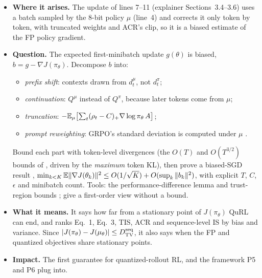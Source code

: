 \documentclass[11pt]{article}
\begin{document}
\begin{itemize}
\item \textbf{Where it arises.} The update of lines 7--11 (explainer Sections~3.4--3.6) uses a batch sampled by the 8-bit policy $\mu$ (line~4) and corrects it only token by token, with truncated weights and ACR's clip, so it is a biased estimate of the FP policy gradient.
\item \textbf{Question.} The expected first-minibatch update $g(\theta)$ is biased, $b=g-\nabla J(\pi_\theta)$. Decompose $b$ into:
  \begin{itemize}
  \item \emph{prefix shift}: contexts drawn from $d^{\mu}_t$, not $d^{\pi}_t$;
  \item \emph{continuation}: $Q^{\mu}$ instead of $Q^{\pi}$, because later tokens come from $\mu$;
  \item \emph{truncation}: $-\mathbb{E}_{\mu}\bigl[\sum_t(\rho_t-C)_+\nabla\log\pi_\theta\,A\bigr]$;
  \item \emph{prompt reweighting}: GRPO's standard deviation is computed under $\mu$ \citep[cf.][]{liu2025drgrpo}.
  \end{itemize}
  Bound each part with token-level divergences (the $O(T)$ and $O(T^{3/2})$ bounds of \citealp{li2025trm}, driven by the \emph{maximum} token KL), then prove a biased-SGD result \citep{ajalloeian2020biased},
  $\min_{k<K}\mathbb{E}\|\nabla J(\theta_k)\|^2\le O(1/\sqrt K)+O(\sup_k\|b_k\|^2)$, with explicit $T$, $C$, $\epsilon$ and minibatch count. Tools: the performance-difference lemma \citep{kakade2002approximately} and trust-region bounds \citep{schulman2015trpo,achiam2017cpo,queeney2021geppo}; \citet{zheng2025stabilizing} give a first-order view without a bound.
\item \textbf{What it means.} It says how far from a stationary point of $J(\pi_\theta)$ QuRL can end, and ranks Eq.~1, Eq.~3, TIS, ACR and sequence-level IS by bias and variance. Since $|J(\pi_\theta)-J(\mu_\theta)|\le D^{\mathrm{seq}}_{\mathrm{TV}}$, it also says when the FP and quantized objectives share stationary points.
\item \textbf{Impact.} The first guarantee for quantized-rollout RL, and the framework P5 and P6 plug into.
\end{itemize}
\end{document}
